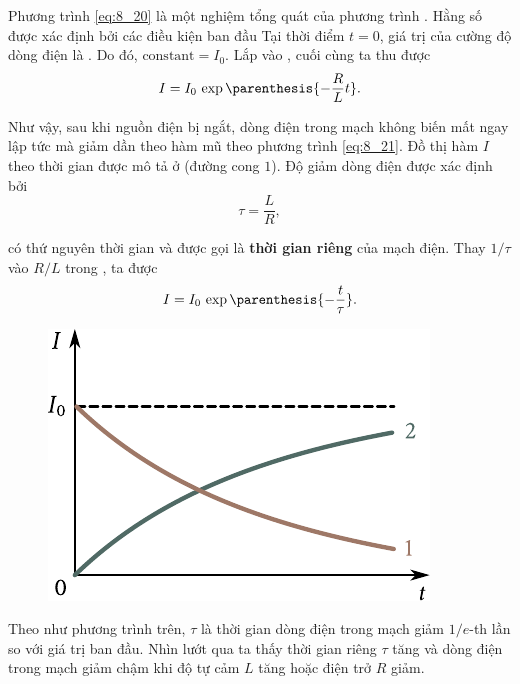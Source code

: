 \noindent
Phương trình \eqref{eq:8_20} là một nghiệm tổng quát của phương trình .
Hằng số được xác định bởi các điều kiện ban đầu
Tại thời điểm $t=0$, giá trị của cường độ dòng điện là .
Do đó, $\text{constant}=I_0$.
Lắp vào , cuối cùng ta thu được
\begin{equation}\label{eq:8_21}
	I = I_0\, \exp\parenthesis{- \frac{R}{L} t}.
\end{equation}

Như vậy, sau khi nguồn điện bị ngắt, dòng điện trong mạch không biến mất ngay lập tức mà giảm dần theo hàm mũ theo phương trình \eqref{eq:8_21}.
Đồ thị hàm $I$ theo thời gian được mô tả ở  (đường cong $1$).
Độ giảm dòng điện được xác định bởi
\begin{equation}\label{eq:8_22}
	\tau = \frac{L}{R},
\end{equation}

\noindent
có thứ nguyên thời gian và được gọi là \textbf{thời gian riêng} của mạch điện.
Thay $1/\tau$ vào $R/L$ trong , ta được
\begin{equation}\label{eq:8_23}
	I = I_0\, \exp\parenthesis{- \frac{t}{\tau}}.
\end{equation}

\begin{figure}[!h]
	\begin{center}
		\includegraphics[scale=1]{figures/ch_08/fig_8_8.pdf}
		\caption[]{}
		\label{fig:8_8}
	\end{center}
	\vspace{-0.8cm}
\end{figure}

\noindent
Theo như phương trình trên, $\tau$ là thời gian dòng điện trong mạch giảm $1/e$-th lần so với giá trị ban đầu.
Nhìn lướt qua  ta thấy thời gian riêng $\tau$ tăng và dòng điện trong mạch giảm chậm khi độ tự cảm $L$ tăng hoặc điện trở $R$ giảm.

